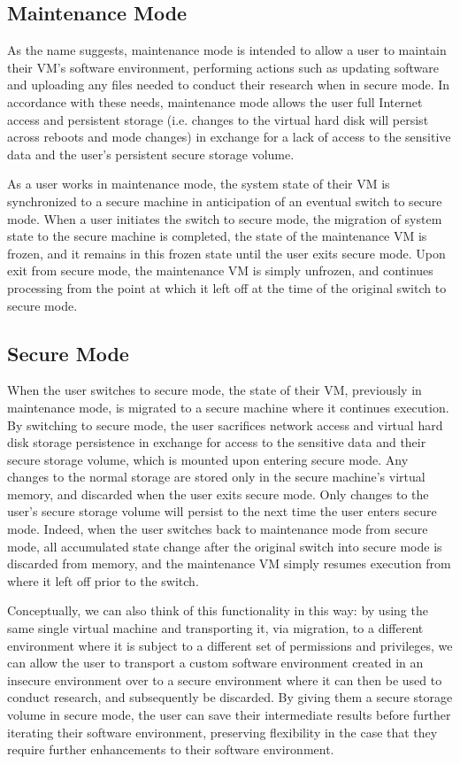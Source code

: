\documentclass{acm_proc_article-sp}
\begin{document}
\subsection{Maintenance Mode}

As the name suggests, maintenance mode is intended to allow a user to maintain
their VM's software environment, performing actions such as updating software
and uploading any files needed to conduct their research when in secure mode.
In accordance with these needs, maintenance mode allows the user full Internet
access and persistent storage (i.e.  changes to the virtual hard disk will
persist across reboots and mode changes) in exchange for a lack of access to
the sensitive data and the user's persistent secure storage volume.

As a user works in maintenance mode, the system state of their VM is
synchronized to a secure machine in anticipation of an eventual switch to
secure mode.  When a user initiates the switch to secure mode, the migration of
system state to the secure machine is completed, the state of the maintenance
VM is frozen, and it remains in this frozen state until the user exits secure
mode.  Upon exit from secure mode, the maintenance VM is simply unfrozen, and
continues processing from the point at which it left off at the time of the
original switch to secure mode.

\subsection{Secure Mode}

When the user switches to secure mode, the state of their VM, previously in
maintenance mode, is migrated to a secure machine where it continues execution.
By switching to secure mode, the user sacrifices network access and virtual
hard disk storage persistence in exchange for access to the sensitive data and
their secure storage volume, which is mounted upon entering secure mode.  Any
changes to the normal storage are stored only in the secure machine's virtual
memory, and discarded when the user exits secure mode.  Only changes to the
user's secure storage volume will persist to the next time the user enters
secure mode.  Indeed, when the user switches back to maintenance mode from
secure mode, all accumulated state change after the original switch into secure
mode is discarded from memory, and the maintenance VM simply resumes execution
from where it left off prior to the switch.

Conceptually, we can also think of this functionality in this way: by using the
same single virtual machine and transporting it, via migration, to a different
environment where it is subject to a different set of permissions and
privileges, we can allow the user to transport a custom software environment
created in an insecure environment over to a secure environment where it can
then be used to conduct research, and subsequently be discarded.  By giving them
a secure storage volume in secure mode, the user can save their intermediate
results before further iterating their software environment, preserving
flexibility in the case that they require further enhancements to their
software environment.
\end{document}
